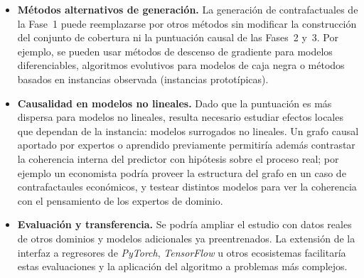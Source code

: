 \documentclass[12pt]{report} %
\begin{document}
\begin{itemize}
    \item \textbf{Métodos alternativos de generación.} La generación de contrafactuales de la Fase~1 puede reemplazarse por otros métodos sin modificar la construcción del conjunto de cobertura ni la puntuación causal de las Fases~2 y~3. Por ejemplo, se pueden usar métodos de descenso de gradiente para modelos diferenciables, algoritmos evolutivos para modelos de caja negra o métodos basados en instancias observada (instancias prototípicas).

    \item \textbf{Causalidad en modelos no lineales.} Dado que la puntuación es más dispersa para modelos no lineales, resulta necesario estudiar efectos locales que dependan de la instancia: modelos surrogados no lineales. Un grafo causal aportado por expertos o aprendido previamente permitiría además contrastar la coherencia interna del predictor con hipótesis sobre el proceso real; por ejemplo un economista podría proveer la estructura del grafo en un caso de contrafactaules económicos, y testear distintos modelos para ver la coherencia con el pensamiento de los expertos de dominio.

    \item \textbf{Evaluación y transferencia.} Se podría ampliar el estudio con datos reales de otros dominios y modelos adicionales ya preentrenados. La extensión de la interfaz a regresores de \textit{PyTorch}, \textit{TensorFlow} u otros ecosistemas facilitaría estas evaluaciones y la aplicación del algoritmo a problemas más complejos.
\end{itemize}



\end{document}

